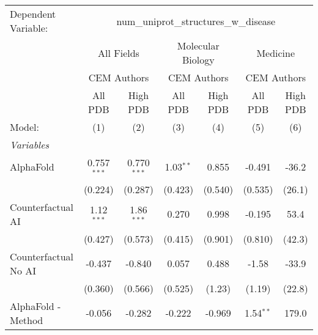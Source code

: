 \begingroup
\centering
\begin{tabular}{lcccccc}
   \tabularnewline \midrule \midrule
   Dependent Variable: & \multicolumn{6}{c}{num\_uniprot\_structures\_w\_disease}\\
 & \multicolumn{2}{c}{All Fields} & \multicolumn{2}{c}{Molecular Biology} & \multicolumn{2}{c}{Medicine} \\
\cmidrule(lr){2-3} \cmidrule(lr){4-5} \cmidrule(lr){6-7}
 & \multicolumn{2}{c}{CEM Authors} & \multicolumn{2}{c}{CEM Authors} & \multicolumn{2}{c}{CEM Authors} \\
\cmidrule(lr){2-3} \cmidrule(lr){4-5} \cmidrule(lr){6-7}
 & \multicolumn{1}{c}{All PDB} & \multicolumn{1}{c}{High PDB} & \multicolumn{1}{c}{All PDB} & \multicolumn{1}{c}{High PDB} & \multicolumn{1}{c}{All PDB} & \multicolumn{1}{c}{High PDB} \\
\cmidrule(lr){2-2} \cmidrule(lr){3-3} \cmidrule(lr){4-4} \cmidrule(lr){5-5} \cmidrule(lr){6-6} \cmidrule(lr){7-7}
   Model:                                                     & (1)           & (2)           & (3)           & (4)           & (5)           & (6)\\  
   \midrule
   \emph{Variables}\\
   AlphaFold                                                  & 0.757$^{***}$ & 0.770$^{***}$ & 1.03$^{**}$   & 0.855         & -0.491        & -36.2\\   
                                                              & (0.224)       & (0.287)       & (0.423)       & (0.540)       & (0.535)       & (26.1)\\   
   Counterfactual AI                                          & 1.12$^{***}$  & 1.86$^{***}$  & 0.270         & 0.998         & -0.195        & 53.4\\   
                                                              & (0.427)       & (0.573)       & (0.415)       & (0.901)       & (0.810)       & (42.3)\\   
   Counterfactual No AI                                       & -0.437        & -0.840        & 0.057         & 0.488         & -1.58         & -33.9\\   
                                                              & (0.360)       & (0.566)       & (0.525)       & (1.23)        & (1.19)        & (22.8)\\   
   AlphaFold - Method                                         & -0.056        & -0.282        & -0.222        & -0.969        & 1.54$^{**}$   & 179.0\\   

\end{tabular}
